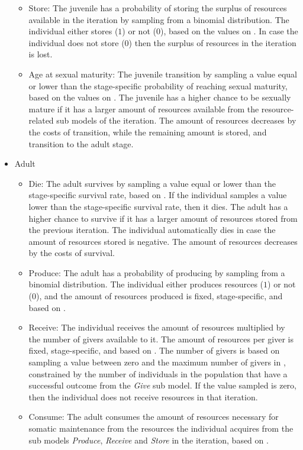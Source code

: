 \documentclass{article}
\begin{document}
\begin{itemize}
\begin{itemize}
        \item Store: The juvenile has a probability of storing the surplus of resources available in the iteration by sampling from a binomial distribution. The individual either stores ($1$) or not ($0$), based on the values on \citep{bowles2011cultivation}. In case the individual does not store ($0$) then the surplus of resources in the iteration is lost.
        \item Age at sexual maturity: The juvenile transition by sampling a value equal or lower than the stage-specific probability of reaching sexual maturity, based on the values on \citep{ellison2017reproductive}. The juvenile has a higher chance to be sexually mature if it has a larger amount of resources available from the resource-related sub models of the iteration. The amount of resources decreases by the costs of transition, while the remaining amount is stored, and transition to the adult stage.
    \end{itemize}
    \item Adult
    \begin{itemize}
        \item Die: The adult survives by sampling a value equal or lower than the stage-specific survival rate, based on \cite{gurven2007longevity}. If the individual samples a value lower than the stage-specific survival rate, then it dies. The adult has a higher chance to survive if it has a larger amount of resources stored from the previous iteration. The individual automatically dies in case the amount of resources stored is negative. The amount of resources decreases by the costs of survival.
        \item Produce: The adult has a probability of producing by sampling from a binomial distribution. The individual either produces resources ($1$) or not ($0$), and the amount of resources produced is fixed, stage-specific, and based on \cite{koster2020life}.
        \item Receive: The individual receives the amount of resources multiplied by the number of givers available to it. The amount of resources per giver is fixed, stage-specific, and based on \cite{gurven2004give}. The number of givers is based on sampling a value between zero and the maximum number of givers in \cite{gurven2004give}, constrained by the number of individuals in the population that have a successful outcome from the \emph{Give} sub model. If the value sampled is zero, then the individual does not receive resources in that iteration.
        \item Consume: The adult consumes the amount of resources necessary for somatic maintenance from the resources the individual acquires from the sub models \emph{Produce}, \emph{Receive} and \emph{Store} in the iteration, based on \cite{kaplan2000theory, pontzer2021daily}.

\end{itemize}
\end{itemize}
\end{document}
